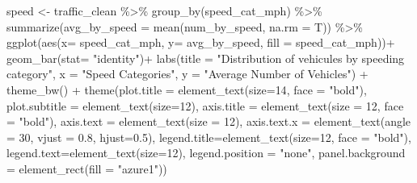 \documentclass[
  10pt,
  letterpaper,
]{article}
\newenvironment{Shaded}{\begin{snugshade}}{\end{snugshade}}
\newcommand{\AttributeTok}[1]{\textcolor[rgb]{0.40,0.45,0.13}{#1}}
\newcommand{\DecValTok}[1]{\textcolor[rgb]{0.68,0.00,0.00}{#1}}
\newcommand{\FloatTok}[1]{\textcolor[rgb]{0.68,0.00,0.00}{#1}}
\newcommand{\FunctionTok}[1]{\textcolor[rgb]{0.28,0.35,0.67}{#1}}
\newcommand{\NormalTok}[1]{\textcolor[rgb]{0.00,0.23,0.31}{#1}}
\newcommand{\OtherTok}[1]{\textcolor[rgb]{0.00,0.23,0.31}{#1}}
\newcommand{\SpecialCharTok}[1]{\textcolor[rgb]{0.37,0.37,0.37}{#1}}
\newcommand{\StringTok}[1]{\textcolor[rgb]{0.13,0.47,0.30}{#1}}
\begin{document}
\begin{Shaded}
\begin{Highlighting}[]
\NormalTok{speed }\OtherTok{\textless{}{-}}\NormalTok{ traffic\_clean }\SpecialCharTok{\%\textgreater{}\%} \FunctionTok{group\_by}\NormalTok{(speed\_cat\_mph) }\SpecialCharTok{\%\textgreater{}\%} 
  \FunctionTok{summarize}\NormalTok{(}\AttributeTok{avg\_by\_speed =} \FunctionTok{mean}\NormalTok{(num\_by\_speed, }\AttributeTok{na.rm =}\NormalTok{ T)) }\SpecialCharTok{\%\textgreater{}\%} 
  \FunctionTok{ggplot}\NormalTok{(}\FunctionTok{aes}\NormalTok{(}\AttributeTok{x=}\NormalTok{ speed\_cat\_mph, }\AttributeTok{y=}\NormalTok{ avg\_by\_speed, }\AttributeTok{fill =}\NormalTok{ speed\_cat\_mph))}\SpecialCharTok{+}
  \FunctionTok{geom\_bar}\NormalTok{(}\AttributeTok{stat=} \StringTok{"identity"}\NormalTok{)}\SpecialCharTok{+}
  \FunctionTok{labs}\NormalTok{(}\AttributeTok{title =} \StringTok{"Distribution of vehicules by speeding category"}\NormalTok{,}
       \AttributeTok{x =} \StringTok{"Speed Categories"}\NormalTok{,}
       \AttributeTok{y =} \StringTok{"Average Number of Vehicles"}\NormalTok{) }\SpecialCharTok{+}
  \FunctionTok{theme\_bw}\NormalTok{() }\SpecialCharTok{+} 
  \FunctionTok{theme}\NormalTok{(}\AttributeTok{plot.title =} \FunctionTok{element\_text}\NormalTok{(}\AttributeTok{size=}\DecValTok{14}\NormalTok{, }\AttributeTok{face =} \StringTok{"bold"}\NormalTok{), }
        \AttributeTok{plot.subtitle =} \FunctionTok{element\_text}\NormalTok{(}\AttributeTok{size=}\DecValTok{12}\NormalTok{),}
        \AttributeTok{axis.title =} \FunctionTok{element\_text}\NormalTok{(}\AttributeTok{size =} \DecValTok{12}\NormalTok{, }\AttributeTok{face =} \StringTok{"bold"}\NormalTok{),}
        \AttributeTok{axis.text =} \FunctionTok{element\_text}\NormalTok{(}\AttributeTok{size =} \DecValTok{12}\NormalTok{),}
        \AttributeTok{axis.text.x =} \FunctionTok{element\_text}\NormalTok{(}\AttributeTok{angle =} \DecValTok{30}\NormalTok{, }\AttributeTok{vjust =} \FloatTok{0.8}\NormalTok{, }\AttributeTok{hjust=}\FloatTok{0.5}\NormalTok{),}
        \AttributeTok{legend.title=}\FunctionTok{element\_text}\NormalTok{(}\AttributeTok{size=}\DecValTok{12}\NormalTok{, }\AttributeTok{face =} \StringTok{"bold"}\NormalTok{),}
        \AttributeTok{legend.text=}\FunctionTok{element\_text}\NormalTok{(}\AttributeTok{size=}\DecValTok{12}\NormalTok{),}
        \AttributeTok{legend.position =} \StringTok{"none"}\NormalTok{,}
        \AttributeTok{panel.background =} \FunctionTok{element\_rect}\NormalTok{(}\AttributeTok{fill =} \StringTok{"azure1"}\NormalTok{))}
\end{Highlighting}
\end{Shaded}
\end{document}
